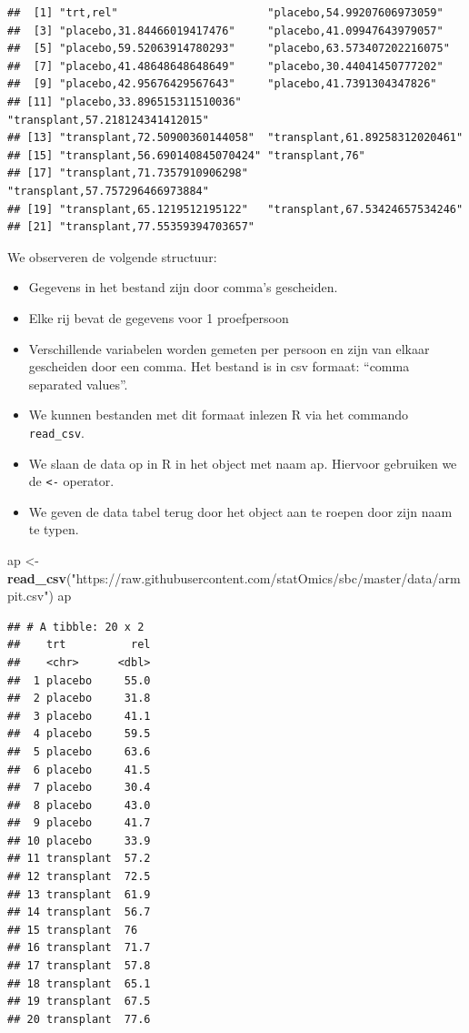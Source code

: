 \documentclass[
  12pt,dutch]{book}
\newenvironment{Shaded}{\begin{snugshade}}{\end{snugshade}}
\newcommand{\FunctionTok}[1]{\textcolor[rgb]{0.13,0.29,0.53}{\textbf{#1}}}
\newcommand{\NormalTok}[1]{#1}
\newcommand{\OtherTok}[1]{\textcolor[rgb]{0.56,0.35,0.01}{#1}}
\newcommand{\StringTok}[1]{\textcolor[rgb]{0.31,0.60,0.02}{#1}}
\providecommand{\tightlist}{%
  \setlength{\itemsep}{0pt}\setlength{\parskip}{0pt}}
\theoremstyle{definition}
\theoremstyle{definition}
\theoremstyle{definition}
\theoremstyle{definition}
\theoremstyle{remark}
\begin{document}
\begin{verbatim}
##  [1] "trt,rel"                       "placebo,54.99207606973059"    
##  [3] "placebo,31.84466019417476"     "placebo,41.09947643979057"    
##  [5] "placebo,59.52063914780293"     "placebo,63.573407202216075"   
##  [7] "placebo,41.48648648648649"     "placebo,30.44041450777202"    
##  [9] "placebo,42.95676429567643"     "placebo,41.7391304347826"     
## [11] "placebo,33.896515311510036"    "transplant,57.218124341412015"
## [13] "transplant,72.50900360144058"  "transplant,61.89258312020461" 
## [15] "transplant,56.690140845070424" "transplant,76"                
## [17] "transplant,71.7357910906298"   "transplant,57.757296466973884"
## [19] "transplant,65.1219512195122"   "transplant,67.53424657534246" 
## [21] "transplant,77.55359394703657"
\end{verbatim}

We observeren de volgende structuur:

\begin{itemize}
\tightlist
\item
  Gegevens in het bestand zijn door comma's gescheiden.
\item
  Elke rij bevat de gegevens voor 1 proefpersoon
\item
  Verschillende variabelen worden gemeten per persoon en zijn van elkaar gescheiden door een comma. Het bestand is in csv formaat: ``comma separated values''.
\item
  We kunnen bestanden met dit formaat inlezen R via het commando \texttt{read\_csv}.
\item
  We slaan de data op in R in het object met naam ap. Hiervoor gebruiken we de \texttt{\textless{}-} operator.
\item
  We geven de data tabel terug door het object aan te roepen door zijn naam te typen.
\end{itemize}

\begin{Shaded}
\begin{Highlighting}[]
\NormalTok{ap }\OtherTok{\textless{}{-}} \FunctionTok{read\_csv}\NormalTok{(}\StringTok{"https://raw.githubusercontent.com/statOmics/sbc/master/data/armpit.csv"}\NormalTok{)}
\NormalTok{ap}
\end{Highlighting}
\end{Shaded}

\begin{verbatim}
## # A tibble: 20 x 2
##    trt          rel
##    <chr>      <dbl>
##  1 placebo     55.0
##  2 placebo     31.8
##  3 placebo     41.1
##  4 placebo     59.5
##  5 placebo     63.6
##  6 placebo     41.5
##  7 placebo     30.4
##  8 placebo     43.0
##  9 placebo     41.7
## 10 placebo     33.9
## 11 transplant  57.2
## 12 transplant  72.5
## 13 transplant  61.9
## 14 transplant  56.7
## 15 transplant  76  
## 16 transplant  71.7
## 17 transplant  57.8
## 18 transplant  65.1
## 19 transplant  67.5
## 20 transplant  77.6
\end{verbatim}
\end{document}
